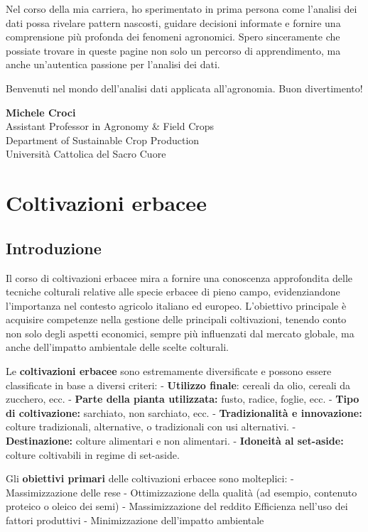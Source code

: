 \documentclass[
]{book}
\theoremstyle{definition}
\theoremstyle{definition}
\theoremstyle{definition}
\theoremstyle{definition}
\theoremstyle{remark}
\begin{document}
Nel corso della mia carriera, ho sperimentato in prima persona come l'analisi dei dati possa rivelare pattern nascosti, guidare decisioni informate e fornire una comprensione più profonda dei fenomeni agronomici. Spero sinceramente che possiate trovare in queste pagine non solo un percorso di apprendimento, ma anche un'autentica passione per l'analisi dei dati.

\citet{campana2021}

Benvenuti nel mondo dell'analisi dati applicata all'agronomia. Buon divertimento!

\textbf{Michele Croci}\\
Assistant Professor in Agronomy \& Field Crops\\
Department of Sustainable Crop Production\\
Università Cattolica del Sacro Cuore

\hypertarget{coltivazioni-erbacee}{%
\chapter{Coltivazioni erbacee}\label{coltivazioni-erbacee}}

\hypertarget{introduzione}{%
\section{Introduzione}\label{introduzione}}

Il corso di coltivazioni erbacee mira a fornire una conoscenza approfondita delle tecniche colturali relative alle specie erbacee di pieno campo, evidenziandone l'importanza nel contesto agricolo italiano ed europeo. L'obiettivo principale è acquisire competenze nella gestione delle principali coltivazioni, tenendo conto non solo degli aspetti economici, sempre più influenzati dal mercato globale, ma anche dell'impatto ambientale delle scelte colturali.

Le \textbf{coltivazioni erbacee} sono estremamente diversificate e possono essere classificate in base a diversi criteri: - \textbf{Utilizzo finale}: cereali da olio, cereali da zucchero, ecc. - \textbf{Parte della pianta utilizzata:} fusto, radice, foglie, ecc. - \textbf{Tipo di coltivazione:} sarchiato, non sarchiato, ecc. - \textbf{Tradizionalità e innovazione:} colture tradizionali, alternative, o tradizionali con usi alternativi. - \textbf{Destinazione:} colture alimentari e non alimentari. - \textbf{Idoneità al set-aside:} colture coltivabili in regime di set-aside.

Gli \textbf{obiettivi primari} delle coltivazioni erbacee sono molteplici: - Massimizzazione delle rese - Ottimizzazione della qualità (ad esempio, contenuto proteico o oleico dei semi) - Massimizzazione del reddito Efficienza nell'uso dei fattori produttivi - Minimizzazione dell'impatto ambientale
\end{document}
